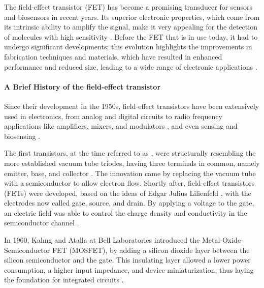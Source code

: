 The field-effect transistor (FET) has become a promising transducer for sensors
and biosensors in recent years. Its superior electronic properties, which come
from its intrinsic ability to amplify the signal, make it very appealing for the
detection of molecules with high sensitivity \citep{xuFlexible2022,
yuRecent2024}. Before the FET that is in use today, it had to undergo
significant developments; this evolution highlights the improvements in
fabrication techniques and materials, which have resulted in enhanced
performance and reduced size, leading to a wide range of electronic applications
\citep{ahmadEvolution2021,tanAdvancements2024}.

\paragraph{A Brief History of the field-effect transistor}

Since their development in the 1950s, field-effect transistors have been
extensively used in electronics, from analog and digital circuits
\citep{kimIntegrated2011, fortunatoOxide2012, yanRecent2022} to radio frequency
applications like amplifiers, mixers, and modulators
\citep{torricelliIntegrated2021, yanRecent2022, pasadasExploiting2023}, and even
sensing and biosensing \citep{shkodraElectrolytegated2021, dengSensors2022}.

The first transistors, at the time referred to as ,
were structurally resembling the more established vacuum tube triodes, having
three terminals in common, namely emitter, base, and collector
\citep{bardeenTransistor1948}. The innovation came by replacing the vacuum tube
with a semiconductor to allow electron flow. Shortly after, field-effect
transistors (FETs) were developed, based on the ideas of Edgar Julius Lilienfeld
\citep{edgarDevice1933, edgarMethod1930}, with the electrodes now called gate,
source, and drain. By applying a voltage to the gate, an electric field was able
to control the charge density and conductivity in the semiconductor channel
\citep{shockleyUnipolar1952}.

In 1960, Kahng and Atalla at Bell Laboratories introduced the
Metal-Oxide-Semiconductor FET (MOSFET), by adding a silicon dioxide layer
between the silicon semiconductor and the gate. This insulating layer allowed a
lower power consumption, a higher input impedance, and device miniaturization,
thus laying the foundation for integrated circuits
\citep{kahngSiliconSilicon1960,atallaNew1962,kilbyMiniaturized1964}.

